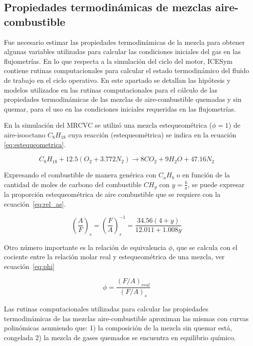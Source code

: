 \subsection{Propiedades termodinámicas de mezclas aire-combustible}\label{subsec:prop_mezcla}
%
Fue necesario estimar las propiedades termodinámicas de la mezcla para obtener
algunas variables utilizadas para calcular las condiciones iniciales del gas en
las flujometrías.
%
En lo que respecta a la simulación del ciclo del motor, ICESym contiene rutinas
computacionales para calcular el estado termodinámico del fluido de trabajo en
el ciclo operativo.
%
En este apartado se detallan las hipótesis y modelos utilizados en las rutinas
computacionales para el cálculo de las propiedades termodinámicas de las mezclas
de aire-combustible quemadas y sin quemar, para el uso en las condiciones
iniciales requeridas en las flujometrías.

En la simulación del MRCVC se utilizó una mezcla estequeométrica ($\phi=1$) de
aire-isooctano $C_{8}H_{18}$ cuya reacción (estequeométrica) se indica en la
ecuación \ref{eq:estequeometrica}.

\begin{equation} \label{eq:estequeometrica}
  C_{8}H_{18} + 12.5 \left(O_{2}+3.772N_{2}\right) \rightarrow 8 CO_{2} + 9 H_{2}O + 47.16 N_{2}
\end{equation}

Expresando el combustible de manera genérica con $C_{a}H_{b}$ o en función de la
cantidad de moles de carbono del combustible $CH_{y}$ con $y=\frac{b}{a}$, se
puede expresar la proporción estequeométrica de aire combustible que se
requiere con la ecuación~\ref{eq:rel_as}.

\begin{equation} \label{eq:rel_as}
  \left(\frac{A}{F}\right)_{s} = \left(\frac{F}{A}\right)_{s}^{-1} = \frac{34.56(4+y)}{12.011 + 1.008y}
\end{equation}


Otro número importante es la relación de equivalencia $\phi$, que se calcula con
el cociente entre la relación molar real y estequeométrica de una mezcla, ver
ecuación~\ref{eq:phi}

\begin{equation}\label{eq:phi}
  \phi = \frac{{(F/A)}_{real}}{{(F/A)}_{s}}
\end{equation}

Las rutinas computacionales utilizadas para calcular las propiedades
termodinámicas de las mezclas aire-combustible aproximan las mismas con curvas
polinómicas asumiendo que: 1) la composición de la mezcla sin quemar está,
congelada 2) la mezcla de gases quemados se encuentra en equilibrio químico.

